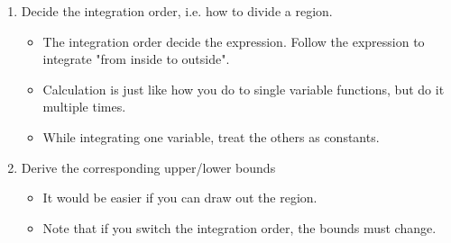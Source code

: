\documentclass[class=article, crop=false, 12pt]{standalone}
\begin{document}
\begin{enumerate}
    \item Decide the integration order, i.e. how to divide a region.
    \begin{itemize}
        
        \item The integration order decide the expression. Follow the expression to integrate "from inside to outside".

        \item Calculation is just like how you do to single variable functions, but do it multiple times. 
        \item While integrating one variable, treat the others as constants.
    \end{itemize}

    \item Derive the corresponding upper/lower bounds
    \begin{itemize}
        \item It would be easier if you can draw out the region.
        \item Note that if you switch the integration order, the bounds must change.
    \end{itemize}

\end{enumerate}
\end{document}
